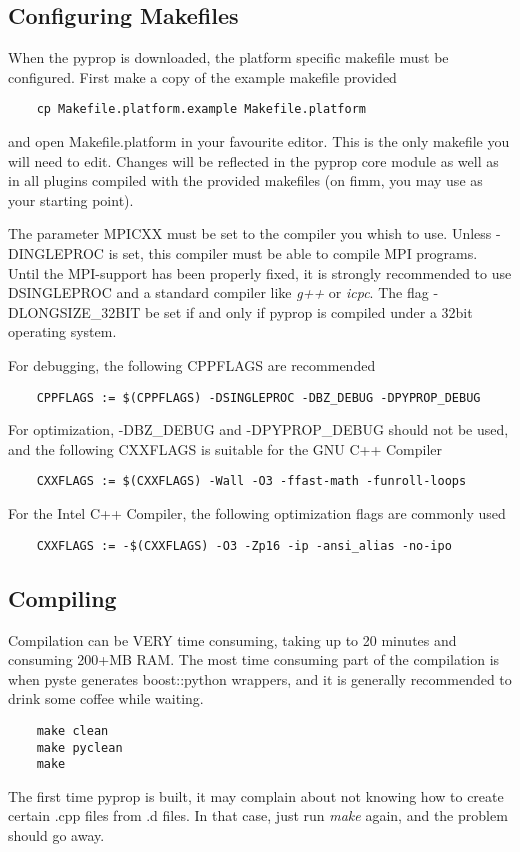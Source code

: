 \subsection*{Configuring Makefiles}
When the pyprop is downloaded, the platform specific makefile must be configured. First make
a copy of the example makefile provided
\begin{verbatim}
	cp Makefile.platform.example Makefile.platform
\end{verbatim}
and open Makefile.platform in your favourite editor. This is the only makefile you will need to edit. 
Changes will be reflected in the pyprop core module as well as in all plugins compiled with the provided
makefiles (on fimm, you may use  as your starting point).

The parameter MPICXX must be set to the compiler you whish to use. Unless -DINGLEPROC is set, this compiler
must be able to compile MPI programs. Until the MPI-support has been properly fixed, it is strongly recommended
to use \-DSINGLEPROC and a standard compiler like \textit{g++} or \textit{icpc}.
The flag -DLONGSIZE\_32BIT be set if and only if pyprop is compiled under a 32bit operating system.

For debugging, the following CPPFLAGS are recommended
\begin{verbatim}
	CPPFLAGS := $(CPPFLAGS) -DSINGLEPROC -DBZ_DEBUG -DPYPROP_DEBUG
\end{verbatim}
For optimization, -DBZ\_DEBUG and -DPYPROP\_DEBUG should not be used, and the following
CXXFLAGS is suitable for the GNU C++ Compiler
\begin{verbatim}
	CXXFLAGS := $(CXXFLAGS) -Wall -O3 -ffast-math -funroll-loops
\end{verbatim}
For the Intel C++ Compiler, the following optimization flags are commonly used
\begin{verbatim}
	CXXFLAGS := -$(CXXFLAGS) -O3 -Zp16 -ip -ansi_alias -no-ipo
\end{verbatim}

\subsection*{Compiling}
Compilation can be VERY time consuming, taking up to 20 minutes and consuming 200+MB RAM. 
The most time consuming part of the compilation is when pyste generates boost::python wrappers, and
it is generally recommended to drink some coffee while waiting.
\begin{verbatim}
	make clean
	make pyclean
	make
\end{verbatim}
The first time pyprop is built, it may complain about not knowing how to create certain .cpp files from
.d files. In that case, just run \textit{make} again, and the problem should go away.

